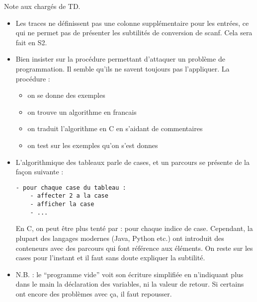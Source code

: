 
\newcommand{\commentaire}[1]{}
\vspace{-1cm}
\begin{correction}
  Note aux chargés de TD.
  \begin{itemize}
 \item Les traces ne définissent pas une colonne supplémentaire pour les entrées, ce qui ne permet pas de présenter les subtilités de conversion de scanf. Cela sera fait en S2. 
  \item Bien insister sur la procédure permettant d'attaquer un problème de programmation. Il semble qu'ils ne savent toujours pas l'appliquer. La procédure :
    \begin{itemize}
    \item on se donne des exemples
    \item on trouve un algorithme en francais
    \item on traduit l'algorithme en C en s'aidant de commentaires
    \item on test sur les exemples qu'on s'est donnes
    \end{itemize}

  \item L'algorithmique des tableaux parle de cases, et un parcours se présente de la façon suivante :
\begin{verbatim}
- pour chaque case du tableau :
    - affecter 2 a la case
    - afficher la case
    - ...
\end{verbatim}
    En C, on peut être plus tenté par : pour chaque indice de
    case. Cependant, la plupart des langages modernes (Java, Python
    etc.) ont introduit des conteneurs avec des parcours qui font
    référence aux éléments. On reste sur les cases pour l'instant et
    il faut sans doute expliquer la subtilité.

  \item N.B. : le ``programme vide'' voit son écriture simplifiée en n'indiquant plus dans le main la déclaration des variables, ni la valeur de retour. Si certains ont encore des problèmes avec ça, il faut repousser.
  \end{itemize}
\end{correction}


